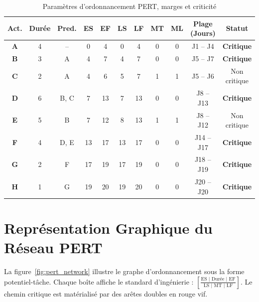 \documentclass[a4paper,12pt]{report}
\begin{document}
	\begin{table}[H]
		\centering
		\small
		\renewcommand{\arraystretch}{1.12}
		\caption{Paramètres d'ordonnancement PERT, marges et criticité}
		\label{tab:calcul_pert}
		\begin{tabularx}{\textwidth}{c c c c c c c c c c c}
			\toprule
			\textbf{Act.} & \textbf{Durée} & \textbf{Pred.} & \textbf{ES} & \textbf{EF} & \textbf{LS} & \textbf{LF} & \textbf{MT} & \textbf{ML} & \textbf{Plage (Jours)} & \textbf{Statut} \\
			\midrule
			\textbf{A} & 4 & -- & 0 & 4 & 0 & 4 & 0 & 0 & J1 -- J4 & \textbf{Critique} \\
			\textbf{B} & 3 & A & 4 & 7 & 4 & 7 & 0 & 0 & J5 -- J7 & \textbf{Critique} \\
			\textbf{C} & 2 & A & 4 & 6 & 5 & 7 & 1 & 1 & J5 -- J6 & Non critique \\
			\textbf{D} & 6 & B, C & 7 & 13 & 7 & 13 & 0 & 0 & J8 -- J13 & \textbf{Critique} \\
			\textbf{E} & 5 & B & 7 & 12 & 8 & 13 & 1 & 1 & J8 -- J12 & Non critique \\
			\textbf{F} & 4 & D, E & 13 & 17 & 13 & 17 & 0 & 0 & J14 -- J17 & \textbf{Critique} \\
			\textbf{G} & 2 & F & 17 & 19 & 17 & 19 & 0 & 0 & J18 -- J19 & \textbf{Critique} \\
			\textbf{H} & 1 & G & 19 & 20 & 19 & 20 & 0 & 0 & J20 -- J20 & \textbf{Critique} \\
			\bottomrule
		\end{tabularx}
	\end{table}
	
	\section{Représentation Graphique du Réseau PERT}
	La figure~\ref{fig:pert_network} illustre le graphe d'ordonnancement sous la forme potentiel-tâche. Chaque boîte affiche le standard d'ingénierie : $\left[\frac{\text{ES }|\text{ Durée }|\text{ EF}}{\text{LS }|\text{ MT }|\text{ LF}}\right]$. Le chemin critique est matérialisé par des arêtes doubles en rouge vif.
	
\end{document}
